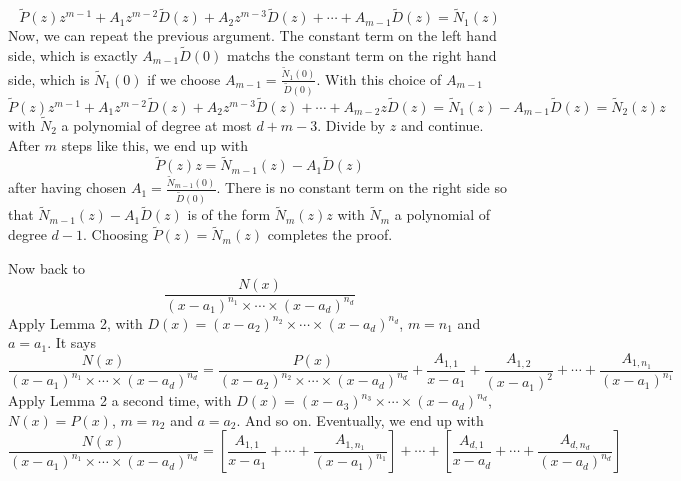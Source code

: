 \[
\tilde{P}(z)z^{m-1} + A_1 z^{m-2} \tilde{D}(z) + A_2 z^{m-3} \tilde{D}(z) + \cdots + A_{m-1} \tilde{D}(z) = \tilde{N}_1(z)
\]
Now, we can repeat the previous argument. The constant term on the left hand side, which
is exactly \(A_{m-1} \tilde{D}(0)\) matchs the constant term on the right hand side, which is \(\tilde{N}_1(0)\) if we
choose \(A_{m-1} = \frac{\tilde{N}_1(0)}{\tilde{D}(0)}\). With this choice of \(A_{m-1}\)
\[
\tilde{P}(z)z^{m-1} + A_1 z^{m-2} \tilde{D}(z) + A_2 z^{m-3} \tilde{D}(z) + \cdots + A_{m-2} z \tilde{D}(z) = \tilde{N}_1(z) - A_{m-1} \tilde{D}(z) = \tilde{N}_2(z)z
\]
with \(\tilde{N}_2\) a polynomial of degree at most \(d + m - 3\). Divide by \(z\) and continue. After \(m\) steps
like this, we end up with
\[
\tilde{P}(z)z = \tilde{N}_{m-1}(z) - A_1 \tilde{D}(z)
\]
after having chosen \(A_1 = \frac{\tilde{N}_{m-1}(0)}{\tilde{D}(0)}\). There is no constant term on the right side so that
\(\tilde{N}_{m-1}(z) - A_1 \tilde{D}(z)\) is of the form \(\tilde{N}_m(z)z\) with \(\tilde{N}_m\) a polynomial of degree \(d - 1\). Choosing
\(\tilde{P}(z) = \tilde{N}_m(z)\) completes the proof.

\bigskip
Now back to
\[
\frac{N(x)}{(x-a_1)^{n_1} \times \cdots \times (x-a_d)^{n_d}}
\]
Apply Lemma 2, with \(D(x) = (x - a_2)^{n_2} \times \cdots \times (x - a_d)^{n_d}\), \(m = n_1\) and \(a = a_1\). It says
\[
\frac{N(x)}{(x-a_1)^{n_1} \times \cdots \times (x-a_d)^{n_d}} = \frac{P(x)}{(x-a_2)^{n_2} \times \cdots \times (x-a_d)^{n_d}} + \frac{A_{1,1}}{x-a_1} + \frac{A_{1,2}}{(x-a_1)^2} + \cdots + \frac{A_{1,n_1}}{(x-a_1)^{n_1}}
\]
Apply Lemma 2 a second time, with \(D(x) = (x - a_3)^{n_3} \times \cdots \times (x - a_d)^{n_d}\), \(N(x) = P(x)\),
\(m = n_2\) and \(a = a_2\). And so on. Eventually, we end up with
\[
\frac{N(x)}{(x-a_1)^{n_1} \times \cdots \times (x-a_d)^{n_d}} = \left[ \frac{A_{1,1}}{x-a_1} + \cdots + \frac{A_{1,n_1}}{(x-a_1)^{n_1}} \right] + \cdots + \left[ \frac{A_{d,1}}{x-a_d} + \cdots + \frac{A_{d,n_d}}{(x-a_d)^{n_d}} \right]
\]

\newpage